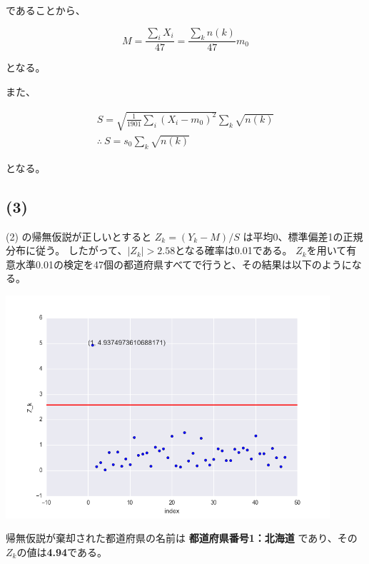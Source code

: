\documentclass[a4j,xelatex,ja=standard,jafont=hiragino-pron, 9pt]{bxjsarticle}
\let\origfigure=\figure
\let\endorigfigure=\endfigure
\renewenvironment{figure}[1][]{%
  \origfigure[H]
}{%
  \endorigfigure
}
\begin{document}
であることから、

\begin{equation}
M = \frac{\sum_i X_i}{47} = \frac{\sum_k n(k)}{47} m_0
\end{equation}

となる。

また、

\begin{eqnarray}
S = \sqrt{\frac{1}{1901} \sum_i (X_i - m_0)^2} \sum_k \sqrt{n(k)} \nonumber \\
\therefore \ S = s_0 \sum_k \sqrt{n(k)}
\end{eqnarray}

となる。

\subsection*{(3)}

(2) の帰無仮説が正しいとすると $Z_k = (Y_k - M) / S$ は平均0、標準偏差1の正規分布に従う。
したがって、$|Z_k| > 2.58$となる確率は0.01である。
$Z_k$を用いて有意水準0.01の検定を47個の都道府県すべてで行うと、その結果は以下のようになる。

\begin{figure}
  \centering
  \includegraphics[width=12cm]{../src/output/image/examine.png}
  \caption{検定の結果}
  \label{}
\end{figure}

帰無仮説が棄却された都道府県の名前は
\textbf{都道府県番号1：北海道}
であり、その$Z_k$の値は\textbf{4.94}である。
\end{document}
